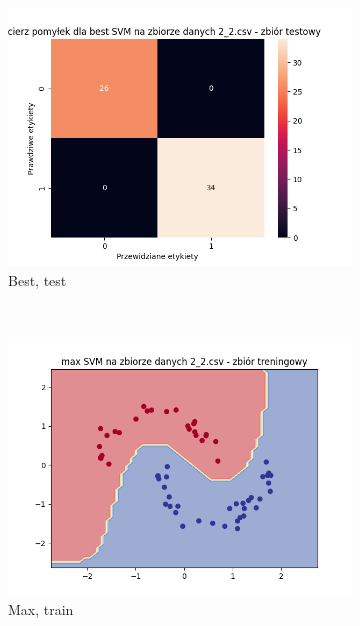 \documentclass[12pt]{article}
\newcommand*{\subfigwidth}{0.24\textwidth}
\begin{document}
\begin{figure}[H]
\begin{subfigure}[t]{\subfigwidth}
        \includegraphics[width=\linewidth]{img/exp_3/svm/2_2/best/test_matrix.png}
        \caption{Best, test}
    \end{subfigure}
    \\
    \begin{subfigure}[t]{\subfigwidth}
        \includegraphics[width=\linewidth]{img/exp_3/svm/2_2/max/train_boundary.png}
        \caption{Max, train}
    \end{subfigure}
    \hfill
    \begin{subfigure}[t]{\subfigwidth}

\end{subfigure}
\end{figure}
\end{document}
